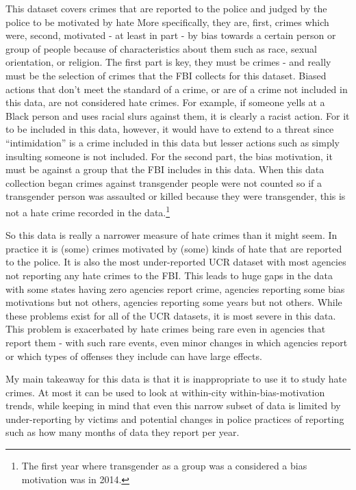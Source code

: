 \documentclass[
  12pt,
  openany]{book}
\begin{document}
This dataset covers crimes that are reported to the police and judged by the police to be motivated by hate More specifically, they are, first, crimes which were, second, motivated - at least in part - by bias towards a certain person or group of people because of characteristics about them such as race, sexual orientation, or religion. The first part is key, they must be crimes - and really must be the selection of crimes that the FBI collects for this dataset. Biased actions that don't meet the standard of a crime, or are of a crime not included in this data, are not considered hate crimes. For example, if someone yells at a Black person and uses racial slurs against them, it is clearly a racist action. For it to be included in this data, however, it would have to extend to a threat since ``intimidation'' is a crime included in this data but lesser actions such as simply insulting someone is not included. For the second part, the bias motivation, it must be against a group that the FBI includes in this data. When this data collection began crimes against transgender people were not counted so if a transgender person was assaulted or killed because they were transgender, this is not a hate crime recorded in the data.\footnote{The first year where transgender as a group was a considered a bias motivation was in 2014.}

So this data is really a narrower measure of hate crimes than it might seem. In practice it is (some) crimes motivated by (some) kinds of hate that are reported to the police. It is also the most under-reported UCR dataset with most agencies not reporting any hate crimes to the FBI. This leads to huge gaps in the data with some states having zero agencies report crime, agencies reporting some bias motivations but not others, agencies reporting some years but not others. While these problems exist for all of the UCR datasets, it is most severe in this data. This problem is exacerbated by hate crimes being rare even in agencies that report them - with such rare events, even minor changes in which agencies report or which types of offenses they include can have large effects.

My main takeaway for this data is that it is inappropriate to use it to study hate crimes. At most it can be used to look at within-city within-bias-motivation trends, while keeping in mind that even this narrow subset of data is limited by under-reporting by victims and potential changes in police practices of reporting such as how many months of data they report per year.
\end{document}

